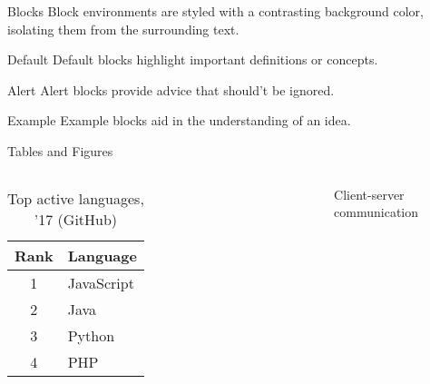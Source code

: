 \documentclass{beamer} %
\begin{document}
\begin{frame}{Blocks}
  Block environments are styled with a contrasting background color, isolating
  them from the surrounding text.

  \begin{block}{Default}
    Default blocks highlight important definitions or concepts.
  \end{block}

  \begin{alertblock}{Alert}
    Alert blocks provide advice that should't be ignored.
  \end{alertblock}

  \begin{exampleblock}{Example}
    Example blocks aid in the understanding of an idea.
  \end{exampleblock}
\end{frame}

\begin{frame}{Tables and Figures}
\begin{columns}
  \begin{table}
    \begin{tabular}{cl}
      \toprule
      Rank & Language\\
      \midrule
      1 & JavaScript\\
      2 & Java\\
      3 & Python\\
      4 & PHP\\
      \bottomrule
    \end{tabular}
    \caption{Top active languages, '17 (GitHub)}
  \end{table}
  \begin{figure}
    \caption{Client-server communication}
  \end{figure}
\end{columns}
\end{frame}
\end{document}
